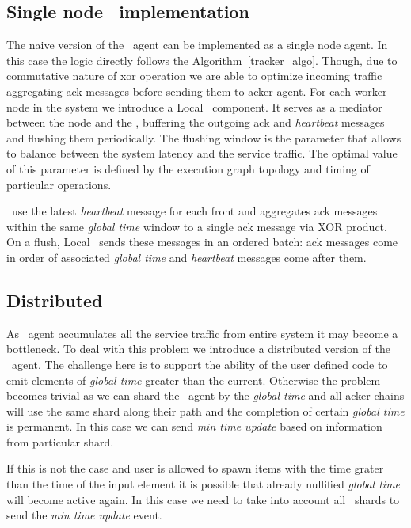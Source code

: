 
\subsection{Single node \tracker\ implementation}
The naive version of the \tracker\ agent can be implemented as a single node agent. In this case the logic directly follows the Algorithm~\ref{tracker_algo}. Though, due to commutative nature of xor operation we are able to optimize incoming traffic aggregating ack messages before sending them to acker agent. For each worker node in the system we introduce a Local \tracker\ component. It serves as a mediator between the node and the \tracker, buffering the outgoing ack and \textit{heartbeat} messages and flushing them periodically. The flushing window is the parameter that allows to balance between the system latency and the service traffic. The optimal value of this parameter is defined by the execution graph topology and timing of particular operations.

\tracker\ use the latest \textit{heartbeat} message for each front and aggregates ack messages within the same \textit{global time} window to a single ack message via XOR product. On a flush, Local \tracker\ sends these messages in an ordered batch: ack messages come in order of associated \textit{global time} and \textit{heartbeat} messages come after them.

\subsection{Distributed \tracker}

As \tracker\ agent accumulates all the service traffic from entire system it may become a bottleneck. To deal with this problem we introduce a distributed version of the \tracker\ agent. The challenge here is to support the ability of the user defined code to emit elements of \textit{global time} greater than the current. Otherwise the problem becomes trivial as we can shard the \tracker\ agent by the \textit{global time} and all acker chains will use the same shard along their path and the completion of certain \textit{global time} is permanent. In this case we can send \textit{min time update} based on information from particular shard.

If this is not the case and user is allowed to spawn items with the time grater than the time of the input element it is possible that already nullified \textit{global time} will become active again. In this case we need to take into account all \tracker\ shards to send the \textit{min time update} event.

